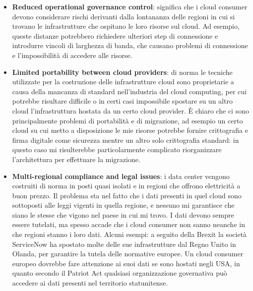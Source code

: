 \begin{itemize}
    \item \textbf{Reduced operational governance control}: significa che i cloud consumer devono considerare rischi derivanti dalla lontananza delle regioni in cui si trovano le infrastrutture che ospitano le loro risorse sul cloud. Ad esempio, queste distanze potrebbero richiedere ulteriori step di connessione e introdurre vincoli di larghezza di banda, che causano problemi di connessione e l'impossibilità di accedere alle risorse.
    \item \textbf{Limited portability between cloud providers}: di norma le tecniche utilizzate per la costruzione delle infrastrutture cloud sono proprietarie a causa della mancanza di standard nell'industria del cloud computing, per cui potrebbe risultare difficile o in certi casi impossibile spostare su un altro cloud l'infrastruttura hostata da un certo cloud provider. È chiaro che ci sono principalmente problemi di portabilità e di migrazione, ad esempio un certo cloud su cui metto a disposizione le mie risorse potrebbe fornire crittografia e firma digitale come sicurezza mentre un altro solo crittografia standard: in questo caso mi risulterebbe particolarmente complicato riorganizzare l'architettura per effettuare la migrazione.
    \item \textbf{Multi-regional compliance and legal issues}: i data center vengono costruiti di norma in posti quasi isolati e in regioni che offrono elettricità a buon prezzo. Il problema sta nel fatto che i dati presenti in quel cloud sono sottoposti alle leggi vigenti in quella regione, e nessuno mi garantisce che siano le stesse che vigono nel paese in cui mi trovo. I dati devono sempre essere tutelati, ma spesso accade che i cloud consumer non sanno neanche in che regioni stanno i loro dati. 
    Alcuni esempi: a seguito della Brexit la società ServiceNow ha spostato molte delle sue infrastrutture dal Regno Unito in Olanda, per garantire la tutela delle normative europee. Un cloud consumer europeo dovrebbe fare attenzione ai suoi dati se sono hostati negli USA, in quanto secondo il Patriot Act qualsiasi organizzazione governativa può accedere ai dati presenti nel territorio statunitense.
\end{itemize}

